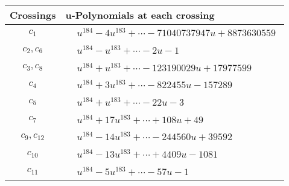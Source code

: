 \documentclass[1p]{elsarticle_modified}
\theoremstyle{definition}
\begin{document}
\begin{tabular}{m{50pt}|m{274pt}}
Crossings & \hspace{64pt}u-Polynomials at each crossing \\
\hline $$\begin{aligned}c_{1}\end{aligned}$$&$\begin{aligned}
&u^{184}-4 u^{183}+\cdots-71040737947 u+8873630559
\end{aligned}$\\
\hline $$\begin{aligned}c_{2},c_{6}\end{aligned}$$&$\begin{aligned}
&u^{184}- u^{183}+\cdots-2 u-1
\end{aligned}$\\
\hline $$\begin{aligned}c_{3},c_{8}\end{aligned}$$&$\begin{aligned}
&u^{184}+u^{183}+\cdots-123190029 u+17977599
\end{aligned}$\\
\hline $$\begin{aligned}c_{4}\end{aligned}$$&$\begin{aligned}
&u^{184}+3 u^{183}+\cdots-822455 u-157289
\end{aligned}$\\
\hline $$\begin{aligned}c_{5}\end{aligned}$$&$\begin{aligned}
&u^{184}+u^{183}+\cdots-22 u-3
\end{aligned}$\\
\hline $$\begin{aligned}c_{7}\end{aligned}$$&$\begin{aligned}
&u^{184}+17 u^{183}+\cdots+108 u+49
\end{aligned}$\\
\hline $$\begin{aligned}c_{9},c_{12}\end{aligned}$$&$\begin{aligned}
&u^{184}-14 u^{183}+\cdots-244560 u+39592
\end{aligned}$\\
\hline $$\begin{aligned}c_{10}\end{aligned}$$&$\begin{aligned}
&u^{184}-13 u^{183}+\cdots+4409 u-1081
\end{aligned}$\\
\hline $$\begin{aligned}c_{11}\end{aligned}$$&$\begin{aligned}
&u^{184}-5 u^{183}+\cdots-57 u-1
\end{aligned}$\\
\hline
\end{tabular}\\~\\
\end{document}
